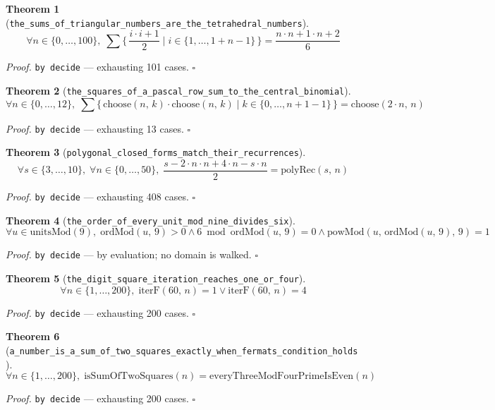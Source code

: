 \documentclass[11pt]{article}
\newtheorem{theorem}{Theorem}[section]
\begin{document}
\begin{theorem}[\texttt{the\_sums\_of\_triangular\_numbers\_are\_the\_tetrahedral\_numbers}]
\[ \forall n \in \{0,\dots,100\},\; \sum \{\, \frac{i \cdot i + 1}{2} \mid i \in \{1,\dots,1+n-1\} \,\} = \frac{n \cdot n + 1 \cdot n + 2}{6} \]
\end{theorem}
\noindent\emph{Proof.} \texttt{by decide} --- exhausting 101 cases. \hfill$\square$

\begin{theorem}[\texttt{the\_squares\_of\_a\_pascal\_row\_sum\_to\_the\_central\_binomial}]
\[ \forall n \in \{0,\dots,12\},\; \sum \{\, \mathrm{choose}\mathopen{}\left(n,\,k\right) \cdot \mathrm{choose}\mathopen{}\left(n,\,k\right) \mid k \in \{0,\dots,n + 1-1\} \,\} = \mathrm{choose}\mathopen{}\left(2 \cdot n,\,n\right) \]
\end{theorem}
\noindent\emph{Proof.} \texttt{by decide} --- exhausting 13 cases. \hfill$\square$

\begin{theorem}[\texttt{polygonal\_closed\_forms\_match\_their\_recurrences}]
\[ \forall s \in \{3,\dots,10\},\; \forall n \in \{0,\dots,50\},\; \frac{s - 2 \cdot n \cdot n + 4 \cdot n - s \cdot n}{2} = \mathrm{polyRec}\mathopen{}\left(s,\,n\right) \]
\end{theorem}
\noindent\emph{Proof.} \texttt{by decide} --- exhausting 408 cases. \hfill$\square$

\begin{theorem}[\texttt{the\_order\_of\_every\_unit\_mod\_nine\_divides\_six}]
\[ \forall u \in \mathrm{unitsMod}\mathopen{}\left(9\right),\; \mathrm{ordMod}\mathopen{}\left(u,\,9\right) > 0 \land 6 \bmod \mathrm{ordMod}\mathopen{}\left(u,\,9\right) = 0 \land \mathrm{powMod}\mathopen{}\left(u,\,\mathrm{ordMod}\mathopen{}\left(u,\,9\right),\,9\right) = 1 \]
\end{theorem}
\noindent\emph{Proof.} \texttt{by decide} --- by evaluation; no domain is walked. \hfill$\square$

\begin{theorem}[\texttt{the\_digit\_square\_iteration\_reaches\_one\_or\_four}]
\[ \forall n \in \{1,\dots,200\},\; \mathrm{iterF}\mathopen{}\left(60,\,n\right) = 1 \lor \mathrm{iterF}\mathopen{}\left(60,\,n\right) = 4 \]
\end{theorem}
\noindent\emph{Proof.} \texttt{by decide} --- exhausting 200 cases. \hfill$\square$

\begin{theorem}[\texttt{a\_number\_is\_a\_sum\_of\_two\_squares\_exactly\_when\_fermats\_condition\_holds}]
\[ \forall n \in \{1,\dots,200\},\; \mathrm{isSumOfTwoSquares}\mathopen{}\left(n\right) = \mathrm{everyThreeModFourPrimeIsEven}\mathopen{}\left(n\right) \]
\end{theorem}
\noindent\emph{Proof.} \texttt{by decide} --- exhausting 200 cases. \hfill$\square$
\end{document}
